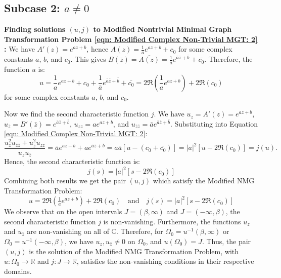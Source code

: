 \documentclass[12pt]{article}
\theoremstyle{plain}
\theoremstyle{definition}
\theoremstyle{remark}
\begin{document}
\subsection{Subcase 2: \(a \neq 0\)}

\textbf{Finding solutions \((u,j)\) to Modified Nontrivial Minimal Graph Transformation Problem \ref{eqn: Modified Complex Non-Trivial MGT: 2} : } We have \(A'(z) = e^{a z + b}\), hence \(A(z) = \frac{1}{a} e^{a z + b} + c_0\) for some complex constants \(a\), \(b\), and \(c_0\). This gives \(B(\bar{z}) = \overline{A(z)} = \frac{1}{\bar{a}} e^{\bar{a} \bar{z} + \bar{b}} + \bar{c_0}\). Therefore, the function \(u\) is:
\begin{equation}
	\label{eqn: u, k=0}
	\boxed{
		u = \frac{1}{a} e^{a z + b} + c_0 + \frac{1}{\bar{a}} e^{\bar{a} \bar{z} + \bar{b}} + \bar{c_0} = 2\Re\left(\frac{1}{a} e^{a z + b}\right) + 2\Re(c_0)
	}
\end{equation}
for some complex constants \(a\), \(b\), and \(c_0\).

Now we find the second characteristic function \(j\). We have \(u_z = A'(z) = e^{a z + b}\), \(u_{\bar{z}} = B'(\bar{z}) = e^{\bar{a} \bar{z} + \bar{b}}\), \(u_{zz} = a e^{a z + b}\), and \(u_{\bar{z}\bar{z}} = \bar{a} e^{\bar{a} \bar{z} + \bar{b}}\). Substituting into Equation \ref{eqn: Modified Complex Non-Trivial MGT: 2}:
\[
\frac{u_z^2 u_{\bar{z}\bar{z}} + u_{\bar{z}}^2 u_{zz}}{u_z u_{\bar{z}}} = \bar{a} e^{a z + b} + a e^{\bar{a} \bar{z} + \bar{b}} = a \bar{a} \left[u - (c_0 + \bar{c_0})\right] = |a|^2 \left[u - 2\Re(c_0)\right] = j(u).
\]
Hence, the second characteristic function is:
\begin{equation}
	\label{eqn: j, k=0}
	\boxed{j(s) = |a|^2 \left[s - 2\Re(c_0)\right]}
\end{equation}
Combining both results we get the pair \((u,j)\) which satisfy the Modified NMG Transformation Problem:
\[
\boxed{u = 2\Re\left(\tfrac{1}{a} e^{a z + b}\right) + 2\Re(c_0)} \quad\text{and}\quad \boxed{j(s) = |a|^2 \left[s - 2\Re(c_0)\right]}
\]
We observe that on the open intervals \(J = (\beta, \infty)\) and \(J = (-\infty, \beta)\), the second characteristic function \(j\) is non-vanishing. Furthermore, the functions \(u_z\) and \(u_{\bar{z}}\) are non-vanishing on all of \(\mathbb{C}\). Therefore, for \(\Omega_0 = u^{-1}(\beta, \infty)\) or \(\Omega_0 = u^{-1}(-\infty, \beta)\), we have \(u_z, u_{\bar{z}} \neq 0\) on \(\Omega_0\), and \(u(\Omega_0) = J\). Thus, the pair \((u, j)\) is the solution of the Modified NMG Transformation Problem, with \(u : \Omega_0 \to \mathbb{R}\) and \(j : J \to \mathbb{R}\), satisfies the non-vanishing conditions in their respective domains.
\end{document}
